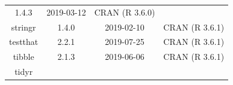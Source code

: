 \documentclass[11pt,]{book}
\begin{document}
\begin{longtable}[]{@{}cccc@{}}
\begin{minipage}[t]{0.19\columnwidth}
1.4.3\strut
\end{minipage} & \begin{minipage}[t]{0.16\columnwidth}\centering\strut
2019-03-12\strut
\end{minipage} & \begin{minipage}[t]{0.36\columnwidth}\centering\strut
CRAN (R 3.6.0)\strut
\end{minipage}\tabularnewline
\begin{minipage}[t]{0.18\columnwidth}\centering\strut
stringr\strut
\end{minipage} & \begin{minipage}[t]{0.19\columnwidth}\centering\strut
1.4.0\strut
\end{minipage} & \begin{minipage}[t]{0.16\columnwidth}\centering\strut
2019-02-10\strut
\end{minipage} & \begin{minipage}[t]{0.36\columnwidth}\centering\strut
CRAN (R 3.6.1)\strut
\end{minipage}\tabularnewline
\begin{minipage}[t]{0.18\columnwidth}\centering\strut
testthat\strut
\end{minipage} & \begin{minipage}[t]{0.19\columnwidth}\centering\strut
2.2.1\strut
\end{minipage} & \begin{minipage}[t]{0.16\columnwidth}\centering\strut
2019-07-25\strut
\end{minipage} & \begin{minipage}[t]{0.36\columnwidth}\centering\strut
CRAN (R 3.6.1)\strut
\end{minipage}\tabularnewline
\begin{minipage}[t]{0.18\columnwidth}\centering\strut
tibble\strut
\end{minipage} & \begin{minipage}[t]{0.19\columnwidth}\centering\strut
2.1.3\strut
\end{minipage} & \begin{minipage}[t]{0.16\columnwidth}\centering\strut
2019-06-06\strut
\end{minipage} & \begin{minipage}[t]{0.36\columnwidth}\centering\strut
CRAN (R 3.6.1)\strut
\end{minipage}\tabularnewline
\begin{minipage}[t]{0.18\columnwidth}\centering\strut
tidyr\strut
\end{minipage} & \begin{minipage}[t]{0.19\columnwidth}\centering\strut

\end{minipage}
\end{longtable}
\end{document}
